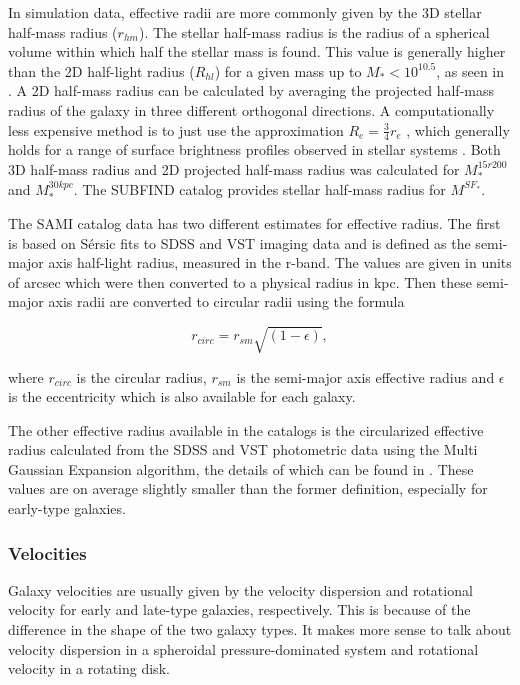 In simulation data, effective radii are more commonly given by the 3D stellar half-mass radius ($r_{hm}$). The stellar half-mass radius is the radius of a spherical volume within which half the stellar mass is found. This value is generally higher than the 2D half-light radius ($R_{hl}$) for a given mass up to $M_{*} < 10^{10.5}$, as seen in \textcite{Genel2017}. A 2D half-mass radius can be calculated by averaging the projected half-mass radius of the galaxy in three different orthogonal directions. A computationally less expensive method is to just use the approximation $R_{e} = \frac{3}{4} r_{e}$ \parencite{Wolf2010}, which generally holds for a range of surface brightness profiles observed in stellar systems \parencite{Wolf2010}. Both 3D half-mass radius and 2D projected half-mass radius was calculated for $M_\ast^{15r200}$ and $M_\ast^{30kpc}$. The SUBFIND catalog provides stellar half-mass radius for $M^{SF_*}$.

The SAMI catalog data has two different estimates for effective radius. The first is based on Sérsic fits to SDSS and VST imaging data and is defined as the semi-major axis half-light radius, measured in the r-band. The values are given in units of arcsec which were then converted to a physical radius in kpc. Then these semi-major axis radii are converted to circular radii using the formula

\begin{equation}
   r_{circ} = r_{sm}\sqrt{(1-\epsilon)},
\end{equation}

where $r_{circ}$ is the circular radius, $r_{sm}$ is the semi-major axis effective radius and $\epsilon$ is the eccentricity which is also available for each galaxy.

The other effective radius available in the catalogs is the circularized effective radius calculated from the SDSS and VST photometric data using the Multi Gaussian Expansion algorithm, the details of which can be found in \textcite{Scott2021}. These values are on average slightly smaller than the former definition, especially for early-type galaxies.

\subsubsection{Velocities}

Galaxy velocities are usually given by the velocity dispersion and rotational velocity for early and late-type galaxies, respectively. This is because of the difference in the shape of the two galaxy types. It makes more sense to talk about velocity dispersion in a spheroidal pressure-dominated system and rotational velocity in a rotating disk.

